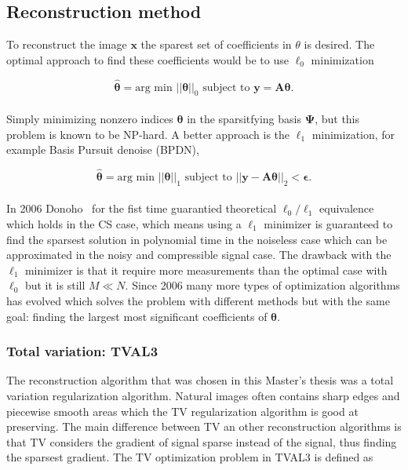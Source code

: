 \subsection{Reconstruction method}
To reconstruct the image $\textbf{x}$ the sparest set of coefficients in $\theta$ is desired. The optimal approach to find these coefficients would be to use $\ell_0$ minimization


\begin{equation}
   \mathbf{ \hat{\theta}} = \text{arg min } ||\mathbf{\theta}||_0 \text{  subject to  } \mathbf{y = A\theta} \text{.}
\end{equation}\\[0.1in]


Simply minimizing nonzero indices $\mathbf{\theta}$ in the sparsitfying basis $\mathbf{\Psi}$, but this problem is known to be NP-hard. A better approach is the $\ell_1$ minimization, for example Basis Pursuit denoise (BPDN),

\begin{equation}
    \mathbf{\hat{\theta}} = \text{arg min } ||\mathbf{\theta}||_1 \text{  subject to  } ||\mathbf{y - A\theta}||_2 < \mathbf{\epsilon} \text{.}
\end{equation}\\[0.1in]


In 2006 Donoho~\cite{article:CS_donoho1} for the fist time guarantied theoretical $\ell_0\text{/}\ell_1$ equivalence which holds in the CS case, which means using a $\ell_1$ minimizer is guaranteed to find the sparsest solution in polynomial time in the noiseless case which can be approximated in the noisy and compressible signal case. The drawback with the $\ell_1$ minimizer is that it require more measurements than the optimal case with $\ell_0$ but it is still $M \ll N$. Since 2006 many more types of optimization algorithms has evolved which solves the problem with different methods but with the same goal: finding the largest most significant coefficients of $\mathbf{\theta}$. \cite{article:CS_donoho1, article:single_pixel_im_cs, article:a_new_ci_arc}


\subsubsection{Total variation: TVAL3}
\label{sec:TV}
The reconstruction algorithm that was chosen in this Master's thesis was a total variation regularization algorithm. Natural images often contains sharp edges and piecewise smooth areas which the TV regularization algorithm is good at preserving. The main difference between TV an other reconstruction algorithms is that TV considers the gradient of signal sparse instead of the signal, thus finding the sparsest gradient. The TV optimization problem in TVAL3 is defined as  

